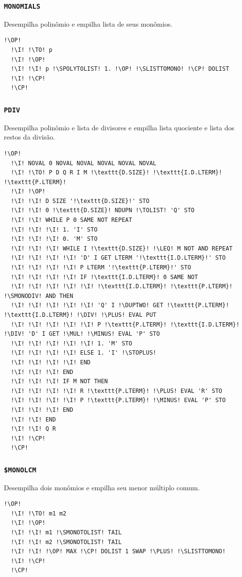 \documentclass[12pt,a4paper]{report}
\newcommand{\kwd}[1]{\texttt{\textcolor{keyword}{#1}}}
\newcommand{\I}{\enspace\textcolor{indent}\vrule\hspace{2pt}}
\newcommand{\DUPTWO}{\kwd{DUP2}}   %
\newcommand{\LEQ}{\kwd{$\leq$}}   %
\newcommand{\PLUS}{\kwd{+}}   %
\newcommand{\MINUS}{\kwd{-}}   %
\newcommand{\MUL}{\kwd{*}}   %
\newcommand{\DIV}{\kwd{/}}   %
\newcommand{\STOPLUS}{\kwd{STO+}} %
\newcommand{\TOLIST}{\kwd{$\rightarrow$LIST}} %
\newcommand{\SPOLYTOLIST}{\kwd{\$POLY{$\rightarrow$}LIST}}   %
\newcommand{\SLISTTOMONO}{\kwd{\$LIST{$\rightarrow$}MONO}}   %
\newcommand{\SMONOTOLIST}{\kwd{\$MONO{$\rightarrow$}LIST}}   %
\newcommand{\SMONODIV}{\kwd{\$MONODIV}}   %
\newcommand{\MONOMIALS}{\kwd{MONOMIALS}}   %
\newcommand{\PDIV}{\kwd{PDIV}}   %
\newcommand{\SMONOLCM}{\kwd{\$MONOLCM}}   %
\newcommand{\OP}{\kwd{$\ll$}}   %
\newcommand{\CP}{\kwd{$\gg$}}   %
\newcommand{\TO}{\kwd{$\rightarrow$}} %
\numberwithin{theorem}{chapter}
\begin{document}
\subsubsection{\MONOMIALS}\label{MONOMIALS}
Desempilha polinômio e empilha lista de seus monômios.
\begin{lstlisting}[language=userrpl]
  !\OP!
  !\I! !\TO! p
  !\I! !\OP!
  !\I! !\I! p !\SPOLYTOLIST! 1. !\OP! !\SLISTTOMONO! !\CP! DOLIST
  !\I! !\CP!
  !\CP!
\end{lstlisting}

\subsubsection{\PDIV}\label{PDIV}
Desempilha polinômio e lista de divisores e empilha lista quociente e
lista dos restos da divisão.
\begin{lstlisting}[language=userrpl]
  !\OP!
  !\I! NOVAL 0 NOVAL NOVAL NOVAL NOVAL NOVAL
  !\I! !\TO! P D Q R I M !\texttt{D.SIZE}! !\texttt{I.D.LTERM}! !\texttt{P.LTERM}!
  !\I! !\OP!
  !\I! !\I! D SIZE '!\texttt{D.SIZE}!' STO
  !\I! !\I! 0 !\texttt{D.SIZE}! NDUPN !\TOLIST! 'Q' STO
  !\I! !\I! WHILE P 0 SAME NOT REPEAT
  !\I! !\I! !\I! 1. 'I' STO
  !\I! !\I! !\I! 0. 'M' STO
  !\I! !\I! !\I! WHILE I !\texttt{D.SIZE}! !\LEQ! M NOT AND REPEAT
  !\I! !\I! !\I! !\I! 'D' I GET LTERM '!\texttt{I.D.LTERM}!' STO
  !\I! !\I! !\I! !\I! P LTERM '!\texttt{P.LTERM}!' STO
  !\I! !\I! !\I! !\I! IF !\texttt{I.D.LTERM}! 0 SAME NOT
  !\I! !\I! !\I! !\I! !\I! !\texttt{I.D.LTERM}! !\texttt{P.LTERM}! !\SMONODIV! AND THEN
  !\I! !\I! !\I! !\I! !\I! 'Q' I !\DUPTWO! GET !\texttt{P.LTERM}! !\texttt{I.D.LTERM}! !\DIV! !\PLUS! EVAL PUT
  !\I! !\I! !\I! !\I! !\I! P !\texttt{P.LTERM}! !\texttt{I.D.LTERM}! !\DIV! 'D' I GET !\MUL! !\MINUS! EVAL 'P' STO
  !\I! !\I! !\I! !\I! !\I! 1. 'M' STO
  !\I! !\I! !\I! !\I! ELSE 1. 'I' !\STOPLUS!
  !\I! !\I! !\I! !\I! END
  !\I! !\I! !\I! END
  !\I! !\I! !\I! IF M NOT THEN
  !\I! !\I! !\I! !\I! R !\texttt{P.LTERM}! !\PLUS! EVAL 'R' STO
  !\I! !\I! !\I! !\I! P !\texttt{P.LTERM}! !\MINUS! EVAL 'P' STO
  !\I! !\I! !\I! END
  !\I! !\I! END
  !\I! !\I! Q R
  !\I! !\CP!
  !\CP!
\end{lstlisting}

\subsubsection{\SMONOLCM}\label{SMONOLCM}
Desempilha dois monômios e empilha seu menor múltiplo comum.
\begin{lstlisting}[language=userrpl]
  !\OP!
  !\I! !\TO! m1 m2
  !\I! !\OP!
  !\I! !\I! m1 !\SMONOTOLIST! TAIL
  !\I! !\I! m2 !\SMONOTOLIST! TAIL
  !\I! !\I! !\OP! MAX !\CP! DOLIST 1 SWAP !\PLUS! !\SLISTTOMONO!
  !\I! !\CP!
  !\CP!
\end{lstlisting}
\end{document}
